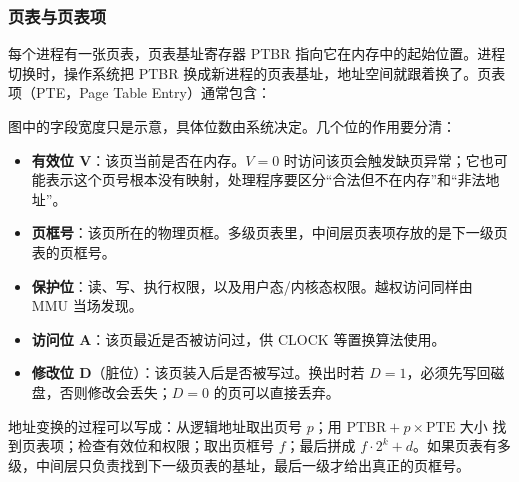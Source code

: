 \subsubsection{页表与页表项}

每个进程有一张页表，页表基址寄存器 PTBR 指向它在内存中的起始位置。进程切换时，操作系统把 PTBR 换成新进程的页表基址，地址空间就跟着换了。页表项（PTE，Page Table Entry）通常包含：

\begin{center}
\end{center}

图中的字段宽度只是示意，具体位数由系统决定。几个位的作用要分清：

\begin{itemize}
  \item \textbf{有效位 V}：该页当前是否在内存。$V=0$ 时访问该页会触发缺页异常；它也可能表示这个页号根本没有映射，处理程序要区分“合法但不在内存”和“非法地址”。
  \item \textbf{页框号}：该页所在的物理页框。多级页表里，中间层页表项存放的是下一级页表的页框号。
  \item \textbf{保护位}：读、写、执行权限，以及用户态/内核态权限。越权访问同样由 MMU 当场发现。
  \item \textbf{访问位 A}：该页最近是否被访问过，供 CLOCK 等置换算法使用。
  \item \textbf{修改位 D}（脏位）：该页装入后是否被写过。换出时若 $D=1$，必须先写回磁盘，否则修改会丢失；$D=0$ 的页可以直接丢弃。
\end{itemize}

地址变换的过程可以写成：从逻辑地址取出页号 $p$；用 $\text{PTBR}+p\times \text{PTE 大小}$ 找到页表项；检查有效位和权限；取出页框号 $f$；最后拼成 $f\cdot 2^k+d$。如果页表有多级，中间层只负责找到下一级页表的基址，最后一级才给出真正的页框号。

